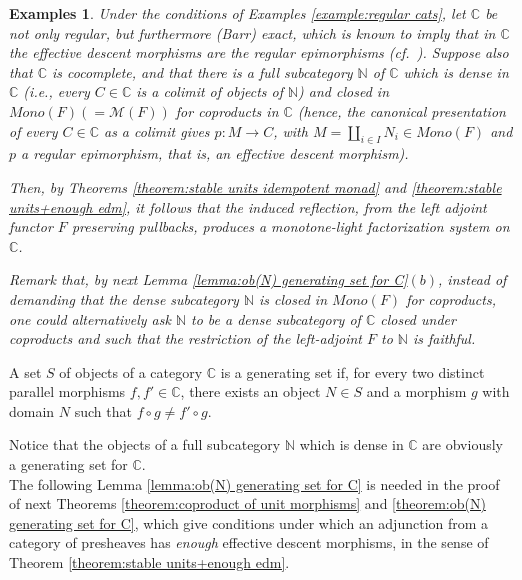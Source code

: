 \documentclass[12pt,a4paper]{amsart}
\newtheorem{examples}[example]{Examples}
\theoremstyle{definition}
\begin{document}
 \begin{examples}\label{example:Barr exact cats}
 Under the conditions of Examples \ref{example:regular cats}, let $\mathbb{C}$ be not only regular, but furthermore (Barr) exact, which is known to imply that in $\mathbb{C}$ the effective descent morphisms are the regular epimorphisms (cf.\ \cite{JST:edm}). Suppose also that $\mathbb{C}$ is cocomplete, and that there is a full subcategory $\mathbb{N}$ of $\mathbb{C}$ which is dense in $\mathbb{C}$ (i.e., every $C\in\mathbb{C}$ is a colimit of objects of $\mathbb{N}$) and closed in $Mono(F)(=\mathcal{M}(F))$ for coproducts in $\mathbb{C}$ (hence, the canonical presentation of every $C\in\mathbb{C}$ as a colimit gives $p:M\rightarrow C$, with $M=\coprod_{i\in I}N_i\in Mono(F)$ and $p$ a regular epimorphism, that is, an effective descent morphism).

 Then, by Theorems \ref{theorem:stable units idempotent monad} and \ref{theorem:stable units+enough edm}, it follows that the induced reflection, from the left adjoint functor $F$ preserving pullbacks, produces a monotone-light factorization system on $\mathbb{C}$.

 Remark that, by next Lemma \ref{lemma:ob(N) generating set for C}$(b)$, instead of demanding that the dense subcategory $\mathbb{N}$ is closed in $Mono(F)$ for coproducts, one could alternatively ask $\mathbb{N}$ to be a dense subcategory of $\mathbb{C}$ closed under coproducts and such that the restriction of the left-adjoint $F$ to $\mathbb{N}$ is faithful.
 \end{examples}

  A set $S$ of objects of a category $\mathbb{C}$ is a generating set if, for every two distinct parallel morphisms $f,f'\in\mathbb{C}$, there exists an object $N\in S$ and a morphism $g$ with domain $N$ such that $f\circ g\neq f'\circ g$.

  Notice that the objects of a full subcategory $\mathbb{N}$ which is dense in $\mathbb{C}$ are obviously a generating set for $\mathbb{C}$.\\

The following Lemma \ref{lemma:ob(N) generating set for C} is needed in the proof of next Theorems \ref{theorem:coproduct of unit morphisms} and \ref{theorem:ob(N) generating set for C}, which give conditions under which an adjunction from a category of presheaves has \emph{enough} effective descent morphisms, in the sense of Theorem \ref{theorem:stable units+enough edm}.
\end{document}
